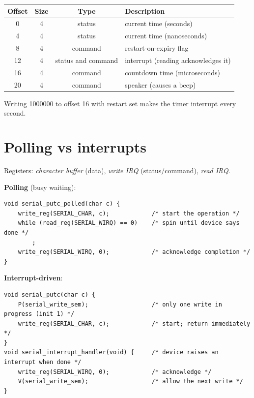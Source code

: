 \begin{example}
\begin{center}
\begin{tabular}{@{}cccl@{}}
\toprule
Offset & Size & Type & Description \\
\midrule
0 & 4 & status & current time (seconds) \\
4 & 4 & status & current time (nanoseconds) \\
8 & 4 & command & restart-on-expiry flag \\
12 & 4 & status and command & interrupt (reading acknowledges it) \\
16 & 4 & command & countdown time (microseconds) \\
20 & 4 & command & speaker (causes a beep) \\
\bottomrule
\end{tabular}
\end{center}
Writing 1000000 to offset 16 with restart set makes the timer interrupt every second.
\end{example}

\section{Polling vs interrupts}

\begin{example}
Registers: \emph{character buffer} (data), \emph{write IRQ} (status/command), \emph{read IRQ}.

\textbf{Polling} (busy waiting):
\begin{lstlisting}[style=c]
void serial_putc_polled(char c) {
    write_reg(SERIAL_CHAR, c);            /* start the operation */
    while (read_reg(SERIAL_WIRQ) == 0)    /* spin until device says done */
        ;
    write_reg(SERIAL_WIRQ, 0);            /* acknowledge completion */
}
\end{lstlisting}
\textbf{Interrupt-driven}:
\begin{lstlisting}[style=c]
void serial_putc(char c) {
    P(serial_write_sem);                  /* only one write in progress (init 1) */
    write_reg(SERIAL_CHAR, c);            /* start; return immediately */
}
void serial_interrupt_handler(void) {     /* device raises an interrupt when done */
    write_reg(SERIAL_WIRQ, 0);            /* acknowledge */
    V(serial_write_sem);                  /* allow the next write */
}
\end{lstlisting}
\end{example}

